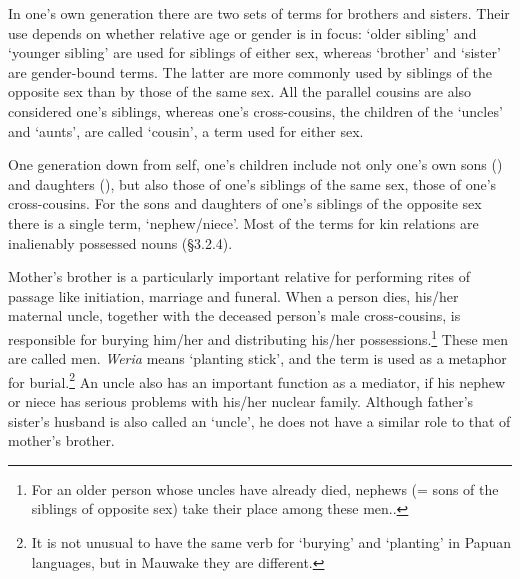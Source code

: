 In one's own generation there are two sets of terms for brothers and sisters. Their use  depends on whether relative age or gender is in focus:  `older sibling' and  `younger sibling' are used for siblings of either sex, whereas  `brother'  and  `sister' are gender-bound terms. The latter are more commonly used by siblings of the opposite sex than by those of the same sex. All the parallel cousins are also considered one's siblings, whereas one's cross-cousins, the children of the `uncles' and `aunts', are called  `cousin', a term used for either sex.

One generation down from self, one's children include not only one's own sons () and daughters (), but also those of one's siblings of the same sex,  those of one's cross-cousins. For the sons and daughters of one's siblings of the opposite sex there is a single term,  `nephew/niece'. Most of the terms for kin relations are inalienably possessed nouns ({\S}3.2.4). 

Mother's brother is a particularly important relative for performing rites of passage like initiation, marriage and funeral. When a person dies, his/her maternal uncle, together with the deceased person's male cross-cousins, is responsible for burying him/her and distributing his/her possessions.\footnote{For an older person whose uncles have already died, nephews (= sons of the siblings of opposite sex) take their place among these men..} These men are called  men.  \textit{Weria} means `planting stick', and the term is used as a metaphor for burial.\footnote{It is not unusual to have the same verb for `burying' and `planting' in Papuan languages, but in Mauwake they are different.} An uncle also has an important function as a mediator, if his nephew or niece has serious problems with his/her nuclear family. Although father's sister's husband is also called an `uncle', he does not have a similar role to that of mother's brother.  

